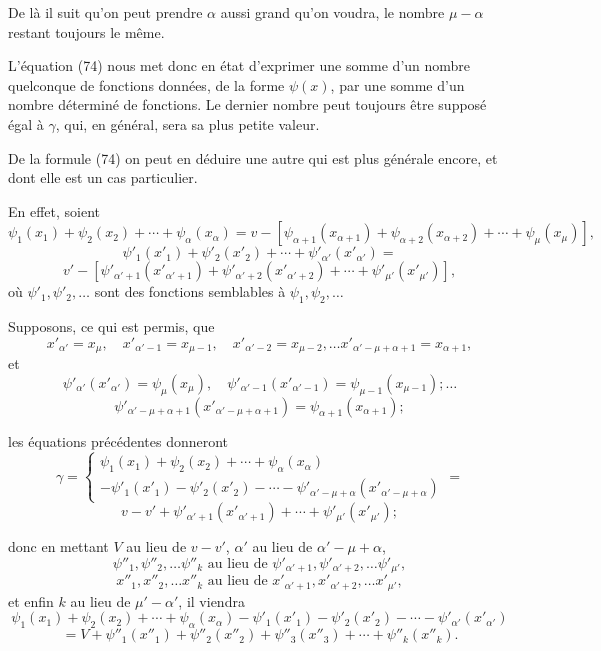 \documentclass{article}
\begin{document}
De là il suit qu'on peut prendre $\alpha$ aussi grand qu'on voudra, le nombre $\mu-\alpha$ restant toujours le même.

L'équation (74) nous met donc en état d'exprimer une somme d'un nombre quelconque de fonctions données, de la forme $\psi(x)$, par une somme d'un nombre déterminé de fonctions. Le dernier nombre peut toujours être supposé égal à $\gamma$, qui, en général, sera sa plus petite valeur.

De la formule (74) on peut en déduire une autre qui est plus générale encore, et dont elle est un cas particulier.

En effet, soient
\[ \psi_1(x_1)+\psi_2(x_2)+\cdots+\psi_\alpha(x_\alpha) = v - \left[\psi_{\alpha+1}(x_{\alpha+1})+\psi_{\alpha+2}(x_{\alpha+2})+\cdots+\psi_\mu(x_\mu)\right], \tag{111} \]
\[ \psi'_1(x'_1) + \psi'_2(x'_2) + \cdots + \psi'_{\alpha'}(x'_{\alpha'}) = \]
\[ v' - \left[\psi'_{\alpha'+1}(x'_{\alpha'+1})+\psi'_{\alpha'+2}(x'_{\alpha'+2})+\cdots+\psi'_{\mu'}(x'_{\mu'})\right], \]
où $\psi'_1, \psi'_2, \ldots$ sont des fonctions semblables à $\psi_1, \psi_2, \ldots$

Supposons, ce qui est permis, que
\[ x'_{\alpha'} = x_\mu, \quad x'_{\alpha'-1} = x_{\mu-1}, \quad x'_{\alpha'-2} = x_{\mu-2}, \ldots x'_{\alpha'-\mu+\alpha+1} = x_{\alpha+1}, \]
et
\[ \psi'_{\alpha'}(x'_{\alpha'}) = \psi_\mu(x_\mu), \quad \psi'_{\alpha'-1}(x'_{\alpha'-1}) = \psi_{\mu-1}(x_{\mu-1}); \ldots \]
\[ \psi'_{\alpha'-\mu+\alpha+1}(x'_{\alpha'-\mu+\alpha+1}) = \psi_{\alpha+1}(x_{\alpha+1}); \]

les équations précédentes donneront
\[ \gamma = \begin{cases}
\psi_1(x_1)+\psi_2(x_2)+\cdots+\psi_\alpha(x_\alpha) \\
-\psi'_1(x'_1)-\psi'_2(x'_2)-\cdots-\psi'_{\alpha'-\mu+\alpha}(x'_{\alpha'-\mu+\alpha})
\end{cases} = \]
\[ v-v'+\psi'_{\alpha'+1}(x'_{\alpha'+1})+\cdots+\psi'_{\mu'}(x'_{\mu'}); \]

donc en mettant $V$ au lieu de $v-v'$, $\alpha'$ au lieu de $\alpha'-\mu+\alpha$,
\[ \psi''_1, \psi''_2, \ldots \psi''_k \text{ au lieu de } \psi'_{\alpha'+1}, \psi'_{\alpha'+2}, \ldots \psi'_{\mu'}, \]
\[ x''_1, x''_2, \ldots x''_k \text{ au lieu de } x'_{\alpha'+1}, x'_{\alpha'+2}, \ldots x'_{\mu'}, \]
et enfin $k$ au lieu de $\mu'-\alpha'$, il viendra
\[ \psi_1(x_1)+\psi_2(x_2)+\cdots+\psi_\alpha(x_\alpha)-\psi'_1(x'_1)-\psi'_2(x'_2)-\cdots-\psi'_{\alpha'}(x'_{\alpha'}) \]
\[ = V + \psi''_1(x''_1) + \psi''_2(x''_2) + \psi''_3(x''_3) + \cdots + \psi''_k(x''_k). \tag{112} \]
\end{document}
